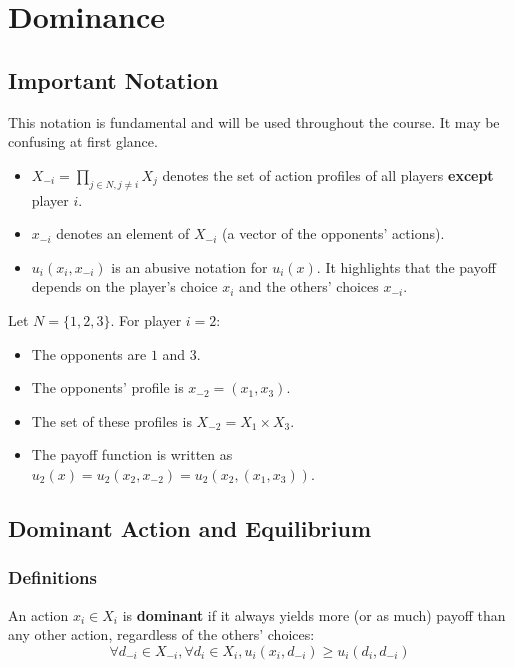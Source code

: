 \chapter{Dominance}

\section{Important Notation}
This notation is fundamental and will be used throughout the course. It may be confusing at first glance.

\begin{itemize}
    \item $X_{-i} = \prod_{j \in N, j \ne i} X_j$ denotes the set of action profiles of all players \textbf{except} player $i$.
    \item $x_{-i}$ denotes an element of $X_{-i}$ (a vector of the opponents' actions).
    \item $u_i(x_i, x_{-i})$ is an abusive notation for $u_i(x)$. It highlights that the payoff depends on the player's choice $x_i$ and the others' choices $x_{-i}$.
\end{itemize}

\begin{exemple}
Let $N = \{1, 2, 3\}$. For player $i=2$:
\begin{itemize}
    \item The opponents are $1$ and $3$.
    \item The opponents' profile is $x_{-2} = (x_1, x_3)$.
    \item The set of these profiles is $X_{-2} = X_1 \times X_3$.
    \item The payoff function is written as $u_2(x) = u_2(x_2, x_{-2}) = u_2(x_2, (x_1, x_3))$.
\end{itemize}
\end{exemple}

\section{Dominant Action and Equilibrium}

\subsection{Definitions}
\begin{definition}
An action $x_i \in X_i$ is \textbf{dominant} if it always yields more (or as much) payoff than any other action, regardless of the others' choices:
$$\forall d_{-i} \in X_{-i}, \forall d_i \in X_i, u_i(x_i, d_{-i}) \ge u_i(d_i, d_{-i})$$
\end{definition}

